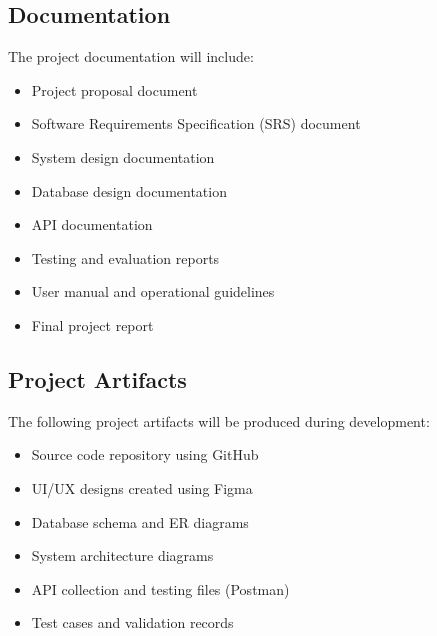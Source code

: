 \subsection{Documentation}
The project documentation will include:
\begin{itemize}
    \item Project proposal document
    \item Software Requirements Specification (SRS) document
    \item System design documentation
    \item Database design documentation
    \item API documentation
    \item Testing and evaluation reports
    \item User manual and operational guidelines
    \item Final project report
\end{itemize}

\subsection{Project Artifacts}
The following project artifacts will be produced during development:
\begin{itemize}
    \item Source code repository using GitHub
    \item UI/UX designs created using Figma
    \item Database schema and ER diagrams
    \item System architecture diagrams
    \item API collection and testing files (Postman)
    \item Test cases and validation records
\end{itemize}

